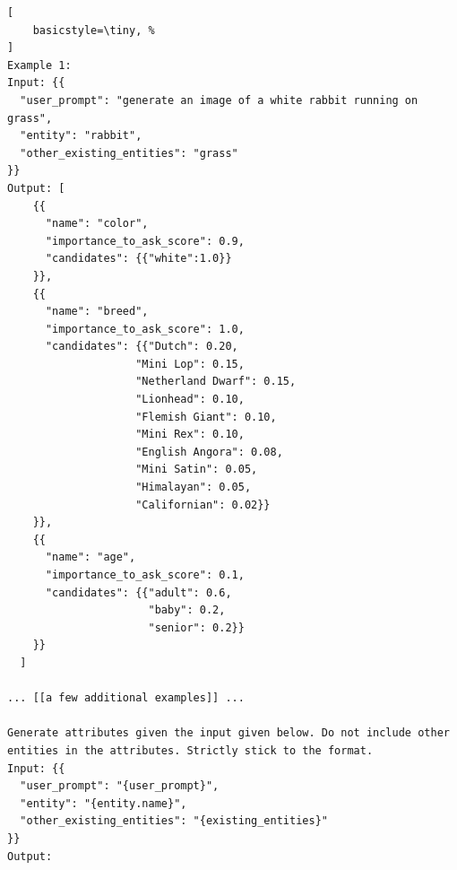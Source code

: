\begin{lstlisting}[
    basicstyle=\tiny, %
]
Example 1:
Input: {{
  "user_prompt": "generate an image of a white rabbit running on grass",
  "entity": "rabbit",
  "other_existing_entities": "grass"
}}
Output: [
    {{
      "name": "color",
      "importance_to_ask_score": 0.9,
      "candidates": {{"white":1.0}}
    }},
    {{
      "name": "breed",
      "importance_to_ask_score": 1.0,
      "candidates": {{"Dutch": 0.20,
                    "Mini Lop": 0.15,
                    "Netherland Dwarf": 0.15,
                    "Lionhead": 0.10,
                    "Flemish Giant": 0.10,
                    "Mini Rex": 0.10,
                    "English Angora": 0.08,
                    "Mini Satin": 0.05,
                    "Himalayan": 0.05,
                    "Californian": 0.02}}
    }},
    {{
      "name": "age",
      "importance_to_ask_score": 0.1,
      "candidates": {{"adult": 0.6,
                      "baby": 0.2,
                      "senior": 0.2}}
    }}
  ]

... [[a few additional examples]] ...

Generate attributes given the input given below. Do not include other entities in the attributes. Strictly stick to the format.
Input: {{
  "user_prompt": "{user_prompt}",
  "entity": "{entity.name}",
  "other_existing_entities": "{existing_entities}"
}}
Output: 
\end{lstlisting}


